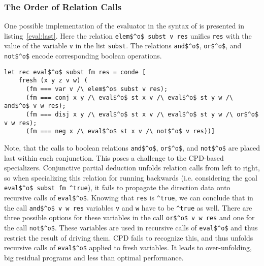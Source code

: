 \subsubsection{The Order of Relation Calls}

One possible implementation of the evaluator in the syntax of \oc{} is presented in listing~\ref{eval:last}.
Here the relation \lstinline{elem$^o$ subst v res} unifies \lstinline{res} with the value of the variable \lstinline{v} in the list \lstinline{subst}.
The relations \lstinline{and$^o$}, \lstinline{or$^o$}, and \lstinline{not$^o$} encode corresponding boolean operations.

\begin{figure*}[!h]
  \centering
  \begin{minipage}{0.95\textwidth}
    \begin{lstlisting}[label={eval:last}, caption={Evaluator of formulas with boolean operation last}, captionpos=b, frame=tb]
  let rec eval$^o$ subst fm res = conde [
    fresh (x y z v w) (
      (fm === var v /\ elem$^o$ subst v res);
      (fm === conj x y /\ eval$^o$ st x v /\ eval$^o$ st y w /\ and$^o$ v w res);
      (fm === disj x y /\ eval$^o$ st x v /\ eval$^o$ st y w /\ or$^o$ v w res);
      (fm === neg x /\ eval$^o$ st x v /\ not$^o$ v res))]
    \end{lstlisting}
  \end{minipage}
\end{figure*}

Note, that the calls to boolean relations \lstinline{and$^o$}, \lstinline{or$^o$}, and \lstinline{not$^o$} are placed last within each conjunction.
This poses a challenge to the CPD-based specializers.
Conjunctive partial deduction unfolds relation calls from left to right, so when specializing this relation for running backwards (i.e. considering the goal \lstinline{eval$^o$ subst fm ^true}), it fails to propagate the direction data onto recursive calls of \lstinline{eval$^o$}.
Knowing that \lstinline{res} is \lstinline{^true}, we can conclude that in the call \lstinline{and$^o$ v w res} variables \lstinline{v} and \lstinline{w} have to be \lstinline{^true} as well.
There are three possible options for these variables in the call \lstinline{or$^o$ v w res} and one for the call \lstinline{not$^o$}.
These variables are used in recursive calls of \lstinline{eval$^o$} and thus restrict the result of driving them.
CPD fails to recognize this, and thus unfolds recursive calls of \lstinline{eval$^o$} applied to fresh variables.
It leads to over-unfolding, big residual programs and less than optimal performance.

